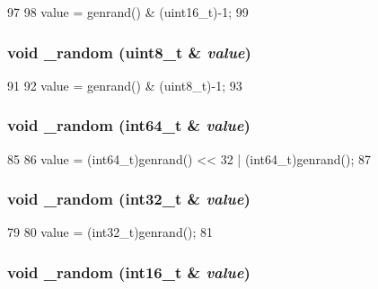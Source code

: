\begin{DoxyCode}
97     {
98         value = genrand() & (uint16_t)-1;
99     }
\end{DoxyCode}
\hypertarget{classRandom_ae79d375e5b04f8f85626a369080b043f}{
\subsubsection[{\_\-random}]{\setlength{\rightskip}{0pt plus 5cm}void \_\-random (uint8\_\-t \& {\em value})}}
\label{classRandom_ae79d375e5b04f8f85626a369080b043f}



\begin{DoxyCode}
91     {
92         value = genrand() & (uint8_t)-1;
93     }
\end{DoxyCode}
\hypertarget{classRandom_aaf3e7bfed1b9adb4682156f0409f3dd5}{
\subsubsection[{\_\-random}]{\setlength{\rightskip}{0pt plus 5cm}void \_\-random (int64\_\-t \& {\em value})}}
\label{classRandom_aaf3e7bfed1b9adb4682156f0409f3dd5}



\begin{DoxyCode}
85     {
86         value = (int64_t)genrand() << 32 | (int64_t)genrand();
87     }
\end{DoxyCode}
\hypertarget{classRandom_ae063fd8ac0eb9077a7d685f708fc05fc}{
\subsubsection[{\_\-random}]{\setlength{\rightskip}{0pt plus 5cm}void \_\-random (int32\_\-t \& {\em value})}}
\label{classRandom_ae063fd8ac0eb9077a7d685f708fc05fc}



\begin{DoxyCode}
79     {
80         value = (int32_t)genrand();
81     }
\end{DoxyCode}
\hypertarget{classRandom_af2b5d710a4947ac49b1a7f88190dc059}{
\subsubsection[{\_\-random}]{\setlength{\rightskip}{0pt plus 5cm}void \_\-random (int16\_\-t \& {\em value})}}
\label{classRandom_af2b5d710a4947ac49b1a7f88190dc059}



